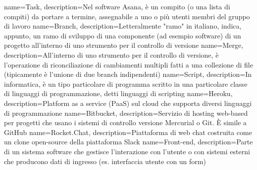  {
	name=Task,
	description={Nel software Asana, è un compito (o una lista di compiti) da portare a termine,
	assegnabile a uno o più utenti membri del gruppo di lavoro}
}
 {
	name=Branch,
	description={Letteralmente "ramo" in italiano, indica, appunto, un ramo di sviluppo di una
	componente (ad esempio software) di un progetto all'interno di uno strumento per il controllo
	di versione}
}
 {
	name=Merge,
	description={All'interno di uno strumento per il controllo di versione, è l'operazione di
	riconciliazione di cambiamenti multipli fatti a una collezione di file (tipicamente è
	l'unione di due branch indipendenti)}
}
 {
	name=Script,
	description={In informatica, è un tipo particolare di programma scritto in una particolare
	classe di linguaggi di programmazione, detti linguaggi di scripting}
}
 {
	name=Heroku,
	description={Platform as a service (PaaS) sul cloud che supporta diversi linguaggi di
	programmazione}
}
 {
	name=Bitbucket,
	description={Servizio di hosting web-based per progetti che usano i sistemi di controllo
	versione Mercurial o Git. È simile a GitHub}
}
 {
	name=Rocket.Chat,
	description={Piattaforma di web chat costruita come un clone open-source della piattaforma
	Slack}
}
 {
	name=Front-end,
	description={Parte di un sistema software che gestisce l'interazione con l'utente o con sistemi esterni che producono dati di ingresso (es. interfaccia utente con un form)}
}